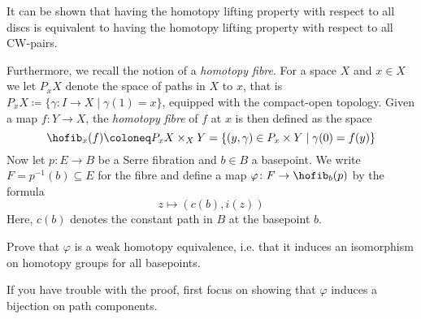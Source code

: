 \begin{exercise}
\begin{itemize}
			It can be shown that having the homotopy lifting property with respect to all discs is equivalent to having the homotopy lifting property with respect to all CW-pairs.
	\end{itemize}
	Furthermore, we recall the notion of a \emph{homotopy fibre}.
	For a space $X$ and $x \in X$ we let $P_x X$ denote the space of paths in $X$ to $x$, that is $P_x X \coloneq \{\gamma\colon I \to X \mid \gamma(1) = x\}$, equipped with the compact-open topology.
	Given a map $f\colon Y \to X$, the \emph{homotopy fibre} of $f$ at $x$ is then defined as the space
	\begin{equation*}
		\hofib_x(f) \coloneq P_x X \times_X Y = \{(y, \gamma) \in P_x \times Y \mid \gamma(0) = f(y)\}
	\end{equation*}
	Now let $p\colon E \to B$ be a Serre fibration and $b \in B$ a basepoint.
	We write $F = p^{-1}(b) \subseteq E$ for the fibre and define a map $\varphi\colon F \to \hofib_b(p)$ by the formula  
	\begin{equation*}
		z \mapsto (c(b), i(z))
	\end{equation*}
	Here, $c(b)$ denotes the constant path in $B$ at the basepoint $b$.

	Prove that $\varphi$ is a weak homotopy equivalence, i.e. that it induces an isomorphism on homotopy groups for all basepoints.
	\begin{hint}
		If you have trouble with the proof, first focus on showing that $\varphi$ induces a bijection on path components.
	\end{hint}
\end{exercise}

